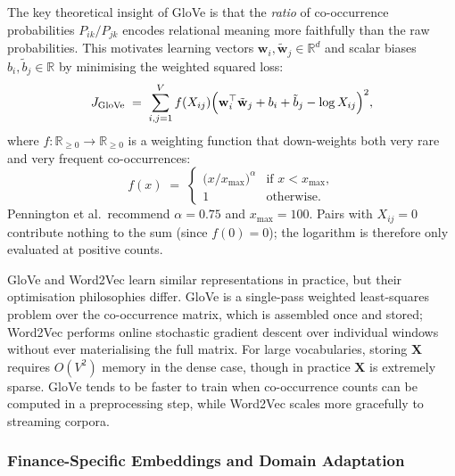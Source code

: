 \begin{deepdive}
The key theoretical insight of GloVe is that the \emph{ratio} of
co-occurrence probabilities $P_{ik}/P_{jk}$ encodes relational
meaning more faithfully than the raw probabilities.  This motivates
learning vectors $\mathbf{w}_i, \tilde{\mathbf{w}}_j \in \mathbb{R}^d$
and scalar biases $b_i, \tilde{b}_j \in \mathbb{R}$ by minimising the
weighted squared loss:
\begin{equation}
  J_{\mathrm{GloVe}}
  \;=\;
  \sum_{i,j=1}^{V}
  f(X_{ij})
  \Bigl(
    \mathbf{w}_i^{\top} \tilde{\mathbf{w}}_j
    + b_i + \tilde{b}_j
    - \log X_{ij}
  \Bigr)^{2},
  \label{eq:glove-obj}
\end{equation}
where $f : \mathbb{R}_{\geq 0} \to \mathbb{R}_{\geq 0}$ is a weighting
function that down-weights both very rare and very frequent co-occurrences:
\begin{equation}
  f(x)
  \;=\;
  \begin{cases}
    \bigl(x / x_{\max}\bigr)^{\alpha} & \text{if } x < x_{\max}, \\
    1 & \text{otherwise.}
  \end{cases}
  \label{eq:glove-weight}
\end{equation}
Pennington et al.\ recommend $\alpha = 0.75$ and $x_{\max} = 100$.
Pairs with $X_{ij} = 0$ contribute nothing to the sum (since
$f(0) = 0$); the logarithm is therefore only evaluated at positive
counts.

\begin{remark}
\label{rem:glove-vs-word2vec}
GloVe and Word2Vec learn similar representations in practice, but their
optimisation philosophies differ.  GloVe is a single-pass weighted
least-squares problem over the co-occurrence matrix, which is assembled
once and stored; Word2Vec performs online stochastic gradient descent
over individual windows without ever materialising the full matrix.  For
large vocabularies, storing $\mathbf{X}$ requires $O(V^2)$ memory in
the dense case, though in practice $\mathbf{X}$ is extremely sparse.
GloVe tends to be faster to train when co-occurrence counts can be
computed in a preprocessing step, while Word2Vec scales more gracefully
to streaming corpora.
\end{remark}

\subsubsection{Finance-Specific Embeddings and Domain Adaptation}
\label{sec:embeddings-finance}


\end{deepdive}
